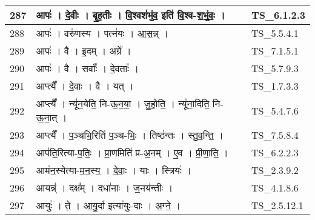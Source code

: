\documentclass[17pt]{extarticle}
\begin{document}
\begin{longtable}{||p{0.4in}||p{4.9in}||p{0.9in}||}
    287 & आपः॑   ।   दे॒वीः   ।   बृ॒ह॒तीः   ।   वि॒श्वश॑भुंव॒ इति॑ वि॒श्व{-}श॒भुं॒वः॒   ।    & TS\_6.1.2.3       \\
    
    \hline
        
    288 & आपः॑   ।   वरु॑णस्य   ।   पत्न॑यः   ।   आ॒स॒न्न्   ।    & TS\_5.5.4.1       \\
    
    \hline
        
    289 & आपः॑   ।   वै   ।   इ॒दम्   ।   अग्रे᳚   ।    & TS\_7.1.5.1       \\
    
    \hline
        
    290 & आपः॑   ।   वै   ।   सर्वाः᳚   ।   दे॒वताः᳚   ।    & TS\_5.7.9.3       \\
    
    \hline
        
    291 & आप्त्यै᳚   ।   दे॒वाः   ।   वै   ।   यत्   ।    & TS\_1.7.3.3       \\
    
    \hline
        
    292 & आप्त्यै᳚   ।   न्यू॑न॒येति॒ नि{-}ऊ॒न॒या॒   ।   जु॒हो॒ति॒   ।   न्यू॑ना॒दिति॒ नि{-}ऊ॒ना॒त्   ।    & TS\_5.4.7.6       \\
    
    \hline
        
    293 & आप्त्यै᳚   ।   प॒ञ्चभि॒रिति॑ प॒ञ्च{-}भिः॒   ।   तिष्ठ॑न्तः   ।   स्तु॒व॒न्ति॒   ।    & TS\_7.5.8.4       \\
    
    \hline
        
    294 & आप॑ति॒रित्या{-}प॒तिः॒   ।   प्रा॒णमिति॑ प्र{-}अ॒नम्   ।   ए॒व   ।   प्री॒णा॒ति॒   ।    & TS\_6.2.2.3       \\
    
    \hline
        
    295 & आम॑न॒स्येत्या{-}म॒न॒स्य॒   ।   दे॒वाः॒   ।   याः   ।   स्त्रियः॑   ।    & TS\_2.3.9.2       \\
    
    \hline
        
    296 & आयन्न्॑   ।   दक्ष᳚म्   ।   दधा॑नाः   ।   ज॒नय॑न्तीः   ।    & TS\_4.1.8.6       \\
    
    \hline
        
    297 & आयुः॑   ।   ते॒   ।   आ॒यु॒र्दा इत्या॑युः{-}दाः   ।   अ॒ग्ने॒   ।    & TS\_2.5.12.1       \\
    

\end{longtable}
\end{document}
